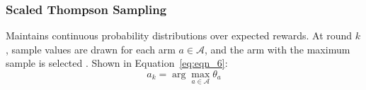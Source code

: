 \subsubsection{Scaled Thompson Sampling}
Maintains continuous probability distributions over expected rewards. At round $k$, sample values are drawn for each arm $a \in \mathcal{A}$, and the arm with the maximum sample is selected \citep{10662607}. Shown in Equation~\eqref{eq:eqn_6}:
\begin{equation}
\label{eq:eqn_6}
a_k = \arg\max_{a \in \mathcal{A}} \theta_a
\end{equation}



